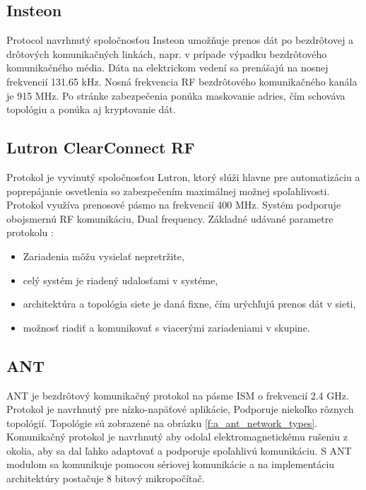\documentclass[12pt,a4wide,oneside,openright]{report}
\begin{document}
\subsection{Insteon}
Protocol navrhnutý spoločnosťou Insteon umožňuje prenos dát po bezdrôtovej a drôtových komunikačných linkách, napr. v prípade výpadku bezdrôtového komunikačného média.
Dáta na elektrickom vedení sa prenášajú na nosnej frekvencií 131.65 kHz. Nosná frekvencia RF bezdrôtového komunikačného kanála je 915 MHz.
Po stránke zabezpečenia ponúka maskovanie adries, čím schováva topológiu a ponúka aj kryptovanie dát. \cite{insteon}

\subsection{Lutron ClearConnect RF}
Protokol je vyvinutý spoločnosťou Lutron, ktorý slúži hlavne pre automatizáciu a poprepájanie osvetlenia so zabezpečením maximálnej možnej spoľahlivosti. Protokol využíva prenosové pásmo na frekvencií 400 MHz. Systém podporuje obojsmernú RF komunikáciu, Dual frequency. Základné udávané parametre protokolu \cite{lutron}:
\begin{itemize}
	\item Zariadenia môžu vysielať nepretržite,
	\item celý systém je riadený udalosťami v systéme,
	\item architektúra a topológia siete je daná fixne, čím urýchľujú prenos dát v sieti,
	\item možnosť riadiť a komunikovať s viacerými zariadeniami v skupine.
\end{itemize}
\onehalfspacing

\subsection{ANT}
ANT je bezdrôtový komunikačný protokol na pásme ISM o frekvencií 2.4 GHz. Protokol je navrhnutý pre nízko-napäťové aplikácie, Podporuje niekoľko rôznych topológií. Topológie sú zobrazené na obrázku \ref{f:a_ant_network_types}. Komunikačný protokol je navrhnutý aby odolal elektromagnetickému rušeniu z okolia, aby sa dal ľahko adaptovať a podporuje spoľahlivú komunikáciu.
S ANT modulom sa komunikuje pomocou sériovej komunikácie a na implementáciu architektúry postačuje 8 bitový mikropočítač.
\end{document}
